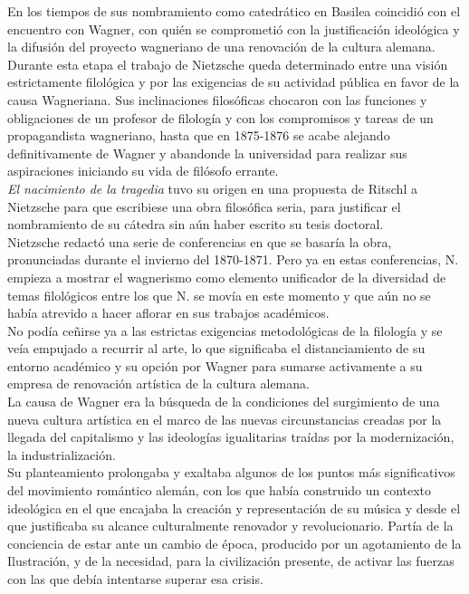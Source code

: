 \documentclass[a4paper, 10pt, twocolumn, spanish]{article}
\begin{document}
En los tiempos de sus nombramiento como catedrático en Basilea
coincidió con el encuentro con Wagner, con quién se comprometió con la
justificación ideológica y la difusión del proyecto wagneriano de una
renovación de la cultura alemana.\\[0pt]

Durante esta etapa el trabajo de Nietzsche queda determinado entre una
visión estrictamente filológica y por las exigencias de su actividad
pública en favor de la causa Wagneriana. Sus inclinaciones filosóficas
chocaron con las funciones y obligaciones de un profesor de filología
y con los compromisos y tareas de un propagandista wagneriano, hasta
que en 1875-1876 se acabe alejando definitivamente de Wagner y
abandonde la universidad para realizar sus aspiraciones iniciando su
vida de filósofo errante.\\[0pt]

\emph{El nacimiento de la tragedia} tuvo su origen en una propuesta de
Ritschl a Nietzsche para que escribiese una obra filosófica seria,
para justificar el nombramiento de su cátedra sin aún haber escrito su
tesis doctoral.\\[0pt]
Nietzsche redactó una serie de conferencias en que se basaría la obra,
pronunciadas durante el invierno del 1870-1871. Pero ya en estas
conferencias, N. empieza a mostrar el wagnerismo como elemento
unificador de la diversidad de temas filológicos entre los que N. se
movía en este momento y que aún no se había atrevido a hacer aflorar
en sus trabajos académicos.\\[0pt]
No podía ceñirse ya a las estrictas exigencias metodológicas de la
filología y se veía empujado a recurrir al arte, lo que significaba el
distanciamiento de su entorno académico y su opción por Wagner para
sumarse activamente a su empresa de renovación artística de la cultura
alemana.\\[0pt]

La causa de Wagner era la búsqueda de la condiciones del surgimiento
de una nueva cultura artística en el marco de las nuevas
circunstancias creadas por la llegada del capitalismo y las ideologías
igualitarias traídas por la modernización, la industrialización.\\[0pt]
Su planteamiento prolongaba y exaltaba algunos de los puntos más
significativos del movimiento romántico alemán, con los que había
construido un contexto ideológica en el que encajaba la creación y
representación de su música y desde el que justificaba su alcance
culturalmente renovador y revolucionario. Partía de la conciencia de
estar ante un cambio de época, producido por un agotamiento de la
Ilustración, y de la necesidad, para la civilización presente, de
activar las fuerzas con las que debía intentarse superar esa crisis.\\[0pt]
\end{document}
